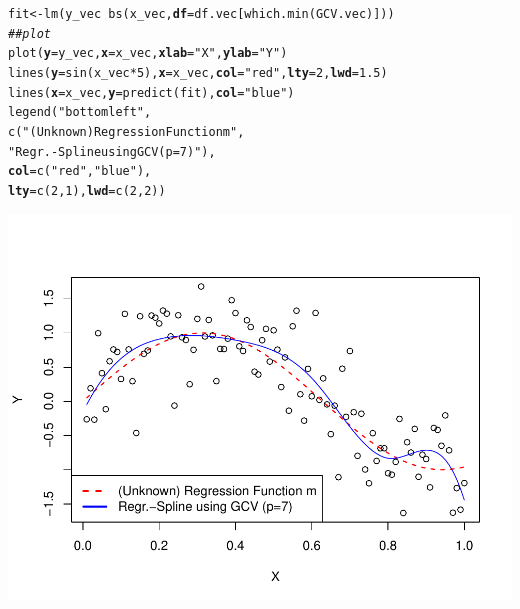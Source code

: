 \documentclass[14pt]{extreport}\usepackage[]{graphicx}\usepackage[]{xcolor}
\makeatletter
\def\maxwidth{ %
  \ifdim\Gin@nat@width>\linewidth
    \linewidth
  \else
    \Gin@nat@width
  \fi
}
\newcommand{\hlnum}[1]{\textcolor[rgb]{0.69,0.494,0}{#1}}%
\newcommand{\hlstr}[1]{\textcolor[rgb]{0.749,0.012,0.012}{#1}}%
\newcommand{\hlcom}[1]{\textcolor[rgb]{0.514,0.506,0.514}{\textit{#1}}}%
\newcommand{\hlopt}[1]{\textcolor[rgb]{0,0,0}{#1}}%
\newcommand{\hlstd}[1]{\textcolor[rgb]{0,0,0}{#1}}%
\newcommand{\hlkwb}[1]{\textcolor[rgb]{0,0.341,0.682}{#1}}%
\newcommand{\hlkwc}[1]{\textcolor[rgb]{0,0,0}{\textbf{#1}}}%
\newcommand{\hlkwd}[1]{\textcolor[rgb]{0.004,0.004,0.506}{#1}}%
\newenvironment{kframe}{%
 \def\at@end@of@kframe{}%
 \ifinner\ifhmode%
  \def\at@end@of@kframe{\end{minipage}}%
  \begin{minipage}{\columnwidth}%
 \fi\fi%
 \def\FrameCommand##1{\hskip\@totalleftmargin \hskip-\fboxsep
 \colorbox{shadecolor}{##1}\hskip-\fboxsep
     \hskip-\linewidth \hskip-\@totalleftmargin \hskip\columnwidth}%
 \MakeFramed {\advance\hsize-\width
   \@totalleftmargin\z@ \linewidth\hsize
   \@setminipage}}%
 {\par\unskip\endMakeFramed%
 \at@end@of@kframe}
\newenvironment{knitrout}{}{} %
\makeatother
\begin{document}
\begin{knitrout}
\color{fgcolor}\begin{kframe}
\begin{alltt}
\hlstd{fit} \hlkwb{<-} \hlkwd{lm}\hlstd{(y_vec} \hlopt{~} \hlkwd{bs}\hlstd{(x_vec,}\hlkwc{df}\hlstd{=df.vec[}\hlkwd{which.min}\hlstd{(GCV.vec)]))}
\hlcom{## plot}
\hlkwd{plot}\hlstd{(}\hlkwc{y}\hlstd{=y_vec,} \hlkwc{x}\hlstd{=x_vec,} \hlkwc{xlab} \hlstd{=} \hlstr{"X"}\hlstd{,} \hlkwc{ylab} \hlstd{=} \hlstr{"Y"}\hlstd{)}
\hlkwd{lines}\hlstd{(}\hlkwc{y}\hlstd{=}\hlkwd{sin}\hlstd{(x_vec} \hlopt{*} \hlnum{5}\hlstd{),} \hlkwc{x}\hlstd{=x_vec,} \hlkwc{col}\hlstd{=}\hlstr{"red"}\hlstd{,} \hlkwc{lty}\hlstd{=}\hlnum{2}\hlstd{,} \hlkwc{lwd}\hlstd{=}\hlnum{1.5}\hlstd{)}
\hlkwd{lines}\hlstd{(}\hlkwc{x}\hlstd{=x_vec,} \hlkwc{y}\hlstd{=}\hlkwd{predict}\hlstd{(fit),} \hlkwc{col}\hlstd{=}\hlstr{"blue"}\hlstd{)}
\hlkwd{legend}\hlstd{(}\hlstr{"bottomleft"}\hlstd{,}
       \hlkwd{c}\hlstd{(}\hlstr{"(Unknown) Regression Function m"}\hlstd{,}
         \hlstr{"Regr.-Spline using GCV (p=7)"}\hlstd{),}
       \hlkwc{col}\hlstd{=}\hlkwd{c}\hlstd{(}\hlstr{"red"}\hlstd{,}\hlstr{"blue"}\hlstd{),}
       \hlkwc{lty}\hlstd{=}\hlkwd{c}\hlstd{(}\hlnum{2}\hlstd{,}\hlnum{1}\hlstd{),} \hlkwc{lwd}\hlstd{=}\hlkwd{c}\hlstd{(}\hlnum{2}\hlstd{,}\hlnum{2}\hlstd{))}
\end{alltt}
\end{kframe}

{\centering \includegraphics[width=\maxwidth]{figure/unnamed-chunk-13-1} 

}


\end{knitrout}
\end{document}
